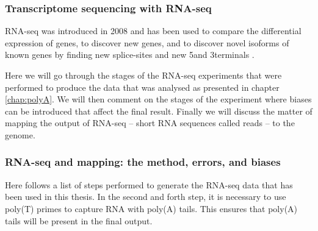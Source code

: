 %
\subsubsection{Transcriptome sequencing with RNA-seq}
RNA-seq was introduced in 2008 \cite{nagalakshmi_transcriptional_2008} and has
been used to compare the differential expression of genes, to discover new
genes, and to discover novel isoforms of known genes by finding new
splice-sites and new 5\ppp and 3\ppp terminals \cite{wang_rna-seq:_2009}.

Here we will go through the stages of the RNA-seq experiments that were
performed to produce the data that was analysed as presented in chapter
\ref{chap:polyA}. We will then comment on the stages of the experiment where
biases can be introduced that affect the final result. Finally we will discuss
the matter of mapping the output of RNA-seq -- short RNA sequences called reads
-- to the genome.

\subsubsection{RNA-seq and mapping: the method, errors, and biases}

Here follows a list of steps performed to generate the RNA-seq data that has
been used in this thesis. In the second and forth step, it is necessary to use
poly(T) primes to capture RNA with poly(A) tails. This ensures that poly(A)
tails will be present in the final output.

